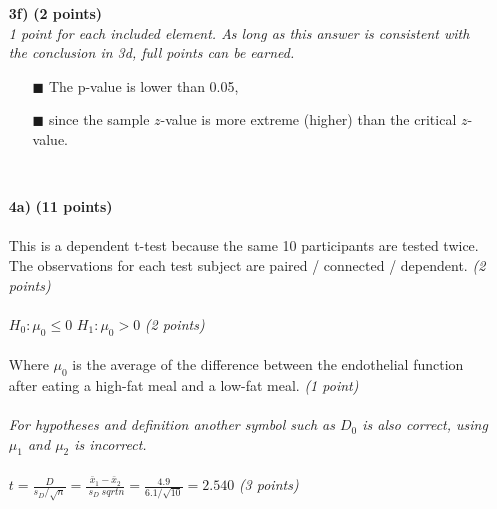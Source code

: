 \begin{itemize}
{good reasoning towards area C.}
        \begin{itemize}
        \item[$\blacksquare$] The p-value is represented by area C,
        \item[$\blacksquare$] since the p-value is the area that is more extreme than the sample ($z$-)value.
        \item[$\blacksquare$] which represents the probability of observing the sample ($z$-)value or more extreme.
        \end{itemize} \\
\item[\textbf{3f)}] \textbf{(2 points)} \\
\textit{1 point for each included element. As long as this answer is consistent with the conclusion in 3d, full points can be earned.}
        \begin{itemize}
        \item[$\blacksquare$] The p-value is lower than 0.05,
        \item[$\blacksquare$] since the sample $z$-value is more extreme (higher) than the critical $z$-value.
        \end{itemize} \\
\item[\textbf{4a)}] \textbf{(11 points)} \\ \\
This is a dependent t-test because the same 10 participants are tested twice. The observations for each test subject are paired / connected / dependent. \textit{(2 points)}\\ \\
$H_0: \mu_0 \leq 0$ \hspace{3cm} $H_1: \mu_0 > 0$ \hspace{3cm} \textit{(2 points)} \\ \\
Where $\mu_0$ is the average of the difference between the endothelial function after eating a high-fat meal and a low-fat meal. \textit{(1 point)} \\ \\ 
\textit{For hypotheses and definition another symbol such as $D_0$ is also correct, using $\mu_1$ and $\mu_2$ is incorrect.} \\ \\
$t = \frac{D}{s_D / \sqrt{n}} = \frac{\bar{x}_1 - \bar{x}_2}{ \ s_D \ sqrt{n}} = \frac{4.9}{6.1 / \sqrt{10}} = 2.540$ \textit{(3 points)}\\ \\

\end{itemize}
